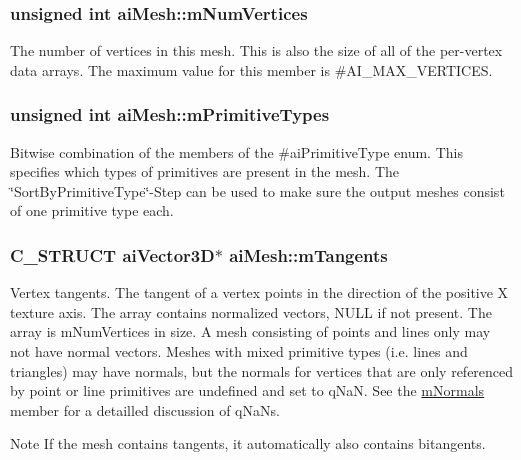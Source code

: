 \subsubsection[{\texorpdfstring{m\+Num\+Vertices}{mNumVertices}}]{\setlength{\rightskip}{0pt plus 5cm}unsigned int ai\+Mesh\+::m\+Num\+Vertices}\hypertarget{structai_mesh_ab34b7b5941e6636f1c08f615cbb072ef}{}\label{structai_mesh_ab34b7b5941e6636f1c08f615cbb072ef}
The number of vertices in this mesh. This is also the size of all of the per-\/vertex data arrays. The maximum value for this member is \#\+A\+I\+\_\+\+M\+A\+X\+\_\+\+V\+E\+R\+T\+I\+C\+ES. 
\subsubsection[{\texorpdfstring{m\+Primitive\+Types}{mPrimitiveTypes}}]{\setlength{\rightskip}{0pt plus 5cm}unsigned int ai\+Mesh\+::m\+Primitive\+Types}\hypertarget{structai_mesh_a99d66ac0a444068c1b252b30265cbf53}{}\label{structai_mesh_a99d66ac0a444068c1b252b30265cbf53}
Bitwise combination of the members of the \#ai\+Primitive\+Type enum. This specifies which types of primitives are present in the mesh. The \char`\"{}\+Sort\+By\+Primitive\+Type\char`\"{}-\/\+Step can be used to make sure the output meshes consist of one primitive type each. 
\subsubsection[{\texorpdfstring{m\+Tangents}{mTangents}}]{\setlength{\rightskip}{0pt plus 5cm}C\+\_\+\+S\+T\+R\+U\+CT {\bf ai\+Vector3D}$\ast$ ai\+Mesh\+::m\+Tangents}\hypertarget{structai_mesh_af367ff78bd69f3e83d7edc8ad67dc5df}{}\label{structai_mesh_af367ff78bd69f3e83d7edc8ad67dc5df}
Vertex tangents. The tangent of a vertex points in the direction of the positive X texture axis. The array contains normalized vectors, N\+U\+LL if not present. The array is m\+Num\+Vertices in size. A mesh consisting of points and lines only may not have normal vectors. Meshes with mixed primitive types (i.\+e. lines and triangles) may have normals, but the normals for vertices that are only referenced by point or line primitives are undefined and set to q\+NaN. See the \hyperlink{structai_mesh_aec81b496b4d93838cef038933dabe9b9}{m\+Normals} member for a detailled discussion of q\+Na\+Ns. \begin{DoxyNote}{Note}
If the mesh contains tangents, it automatically also contains bitangents. 
\end{DoxyNote}
